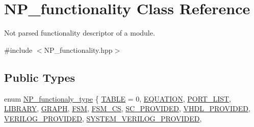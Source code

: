 \hypertarget{classNP__functionality}{}\section{N\+P\+\_\+functionality Class Reference}
\label{classNP__functionality}


Not parsed functionality descriptor of a module.  




{\ttfamily \#include $<$N\+P\+\_\+functionality.\+hpp$>$}

\subsection*{Public Types}
\begin{DoxyCompactItemize}
\item 
enum \hyperlink{classNP__functionality_a318d6f254060bfdf145ebeb41efe772e}{N\+P\+\_\+functionaly\+\_\+type} \{ \newline
\hyperlink{classNP__functionality_a318d6f254060bfdf145ebeb41efe772eaf0088d1d702a29287c4f62e440ea2c43}{T\+A\+B\+LE} = 0, 
\hyperlink{classNP__functionality_a318d6f254060bfdf145ebeb41efe772ea613ebeb520a2bbc8e5a0d36a8a470789}{E\+Q\+U\+A\+T\+I\+ON}, 
\hyperlink{classNP__functionality_a318d6f254060bfdf145ebeb41efe772eaa6ab35fc8bb1b2032cb8e0a32fc1ce4d}{P\+O\+R\+T\+\_\+\+L\+I\+ST}, 
\hyperlink{classNP__functionality_a318d6f254060bfdf145ebeb41efe772ea3b9722f936843fecd500060388fc65e6}{L\+I\+B\+R\+A\+RY}, 
\newline
\hyperlink{classNP__functionality_a318d6f254060bfdf145ebeb41efe772eaa8ab71553d71abe40e3068520f3660c5}{G\+R\+A\+PH}, 
\hyperlink{classNP__functionality_a318d6f254060bfdf145ebeb41efe772ea3ca7b7685d2a136721b68d2f00fbe8f2}{F\+SM}, 
\hyperlink{classNP__functionality_a318d6f254060bfdf145ebeb41efe772ea8ae91ef148ad60722a044d47938c3b73}{F\+S\+M\+\_\+\+CS}, 
\hyperlink{classNP__functionality_a318d6f254060bfdf145ebeb41efe772eae1d564ea3998dca41c383e0482842adb}{S\+C\+\_\+\+P\+R\+O\+V\+I\+D\+ED}, 
\newline
\hyperlink{classNP__functionality_a318d6f254060bfdf145ebeb41efe772eac92c7038cdc0ab36ea3954bff6674a91}{V\+H\+D\+L\+\_\+\+P\+R\+O\+V\+I\+D\+ED}, 
\hyperlink{classNP__functionality_a318d6f254060bfdf145ebeb41efe772ead1f761a9b16f0b4019c11656a6dbc2d8}{V\+E\+R\+I\+L\+O\+G\+\_\+\+P\+R\+O\+V\+I\+D\+ED}, 
\hyperlink{classNP__functionality_a318d6f254060bfdf145ebeb41efe772eaee1023f784d8d3c532dc8197160a63dd}{S\+Y\+S\+T\+E\+M\+\_\+\+V\+E\+R\+I\+L\+O\+G\+\_\+\+P\+R\+O\+V\+I\+D\+ED}, 

\end{DoxyCompactItemize}
